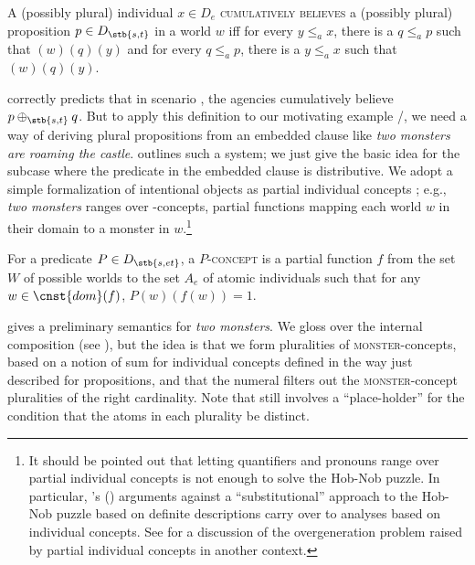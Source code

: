 \documentclass[output=paper]{langscibook}
\begin{document}
\eanoraggedright \label{sch-has:ex:26} A (possibly plural) individual $x \in D_e$ \textsc{cumulatively believes} a (possibly plural) proposition $p \in D_{\stb{s, t}}$ in a world $w$ iff 
\ea for every $y \leq_a x$, there is a $q \leq_a p$ such that $(w)(q)(y)$
\ex and for every $q \leq_a p$, there is a $y \leq_a x$ such that $(w)(q)(y)$. \z\z

\noindent {} correctly predicts that in scenario , the agencies cumulatively believe $p \oplus_{\stb{s, t}}q$. But to apply this definition to our motivating example /, we need a way of deriving plural propositions from an embedded clause like \textit{two monsters are roaming the castle}. \citet{Schmitt:2019} outlines such a system; we just give the basic idea for the subcase where the predicate in the embedded clause is distributive. We adopt a simple formalization of intentional objects as partial individual concepts ; e.g., \textit{two monsters} ranges over -concepts, partial functions mapping each world $w$ in their domain to a monster in $w$.\footnote{It should be pointed out that letting quantifiers and pronouns range over partial individual concepts is not enough to solve the Hob-Nob puzzle. In particular, \citeauthor{Edelberg:1986}'s (\citeyear{Edelberg:1986,Edelberg:1992})  %
arguments against a ``substitutional'' approach to the Hob-Nob puzzle based on definite descriptions carry over to analyses based on individual concepts. See \citet{Schwager:2007} for a discussion of the overgeneration problem raised by partial individual concepts in another context.}

\eanoraggedright \label{sch-has:ex:27} For a predicate $P \in D_{\stb{s, et}}$, a $P$-\textsc{concept} is a partial function $f$ from the set $W$ of possible worlds to the set $A_e$ of atomic individuals such that for any $w \in \cnst{dom}(f)$, $P(w)(f(w)) = 1$.
\z

\noindent  {} gives a preliminary semantics for \textit{two monsters}. We gloss over the internal composition (see \citealt{Schmitt:2019}), but the idea is that we form pluralities of \textsc{monster}-concepts, based on a notion of sum for individual concepts defined in the way just described for propositions, and that the numeral filters out the \textsc{monster}-concept pluralities of the right cardinality. Note that  still involves a ``place-holder'' for the condition that the atoms in each plurality be distinct. %
\end{document}
